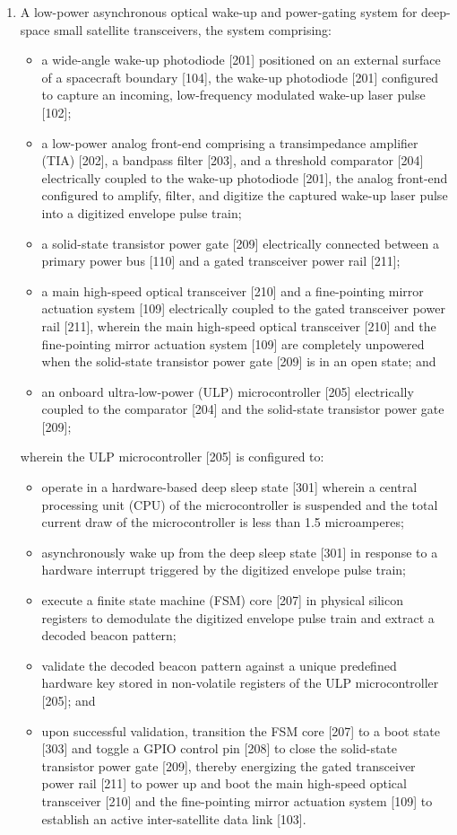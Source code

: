 \documentclass[12pt,a4paper]{article}
\begin{document}
\begin{enumerate}
    \item A low-power asynchronous optical wake-up and power-gating system for deep-space small satellite transceivers, the system comprising:
    \begin{itemize}
        \item a wide-angle wake-up photodiode [201] positioned on an external surface of a spacecraft boundary [104], the wake-up photodiode [201] configured to capture an incoming, low-frequency modulated wake-up laser pulse [102];
        \item a low-power analog front-end comprising a transimpedance amplifier (TIA) [202], a bandpass filter [203], and a threshold comparator [204] electrically coupled to the wake-up photodiode [201], the analog front-end configured to amplify, filter, and digitize the captured wake-up laser pulse into a digitized envelope pulse train;
        \item a solid-state transistor power gate [209] electrically connected between a primary power bus [110] and a gated transceiver power rail [211];
        \item a main high-speed optical transceiver [210] and a fine-pointing mirror actuation system [109] electrically coupled to the gated transceiver power rail [211], wherein the main high-speed optical transceiver [210] and the fine-pointing mirror actuation system [109] are completely unpowered when the solid-state transistor power gate [209] is in an open state; and
        \item an onboard ultra-low-power (ULP) microcontroller [205] electrically coupled to the comparator [204] and the solid-state transistor power gate [209];
    \end{itemize}
    wherein the ULP microcontroller [205] is configured to:
    \begin{itemize}
        \item operate in a hardware-based deep sleep state [301] wherein a central processing unit (CPU) of the microcontroller is suspended and the total current draw of the microcontroller is less than 1.5 microamperes;
        \item asynchronously wake up from the deep sleep state [301] in response to a hardware interrupt triggered by the digitized envelope pulse train;
        \item execute a finite state machine (FSM) core [207] in physical silicon registers to demodulate the digitized envelope pulse train and extract a decoded beacon pattern;
        \item validate the decoded beacon pattern against a unique predefined hardware key stored in non-volatile registers of the ULP microcontroller [205]; and
        \item upon successful validation, transition the FSM core [207] to a boot state [303] and toggle a GPIO control pin [208] to close the solid-state transistor power gate [209], thereby energizing the gated transceiver power rail [211] to power up and boot the main high-speed optical transceiver [210] and the fine-pointing mirror actuation system [109] to establish an active inter-satellite data link [103].
    \end{itemize}


\end{enumerate}
\end{document}
